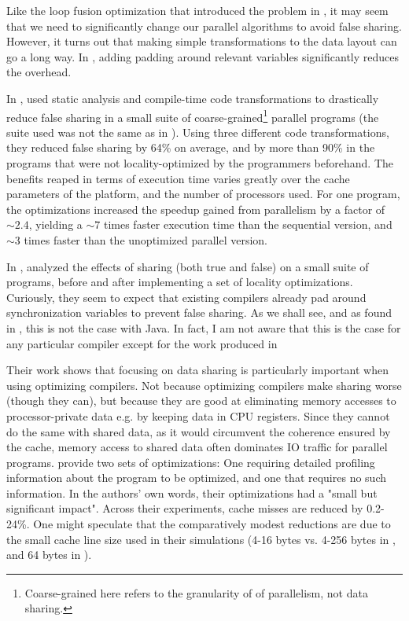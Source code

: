 Like the loop fusion optimization that introduced the problem in \cite{mystery},
it may seem that we need to significantly change our parallel algorithms to
avoid false sharing. However, it turns out that making simple transformations to
the data layout can go a long way. In \cite{mystery}, adding padding around
relevant variables significantly reduces the overhead.

In \citeyear{eggersReducing}, \citeauthor{eggersReducing} used static analysis
and compile-time code transformations to drastically reduce false sharing in a
small suite of coarse-grained\footnote{Coarse-grained here refers to the
granularity of of parallelism, not data sharing.} parallel programs
\cite{eggersReducing} (the suite used was not the same as in \cite{eggersbus}).
Using three different code transformations, they reduced false sharing by 64\%
on average, and by more than 90\% in the programs that were not
locality-optimized by the programmers beforehand. The benefits reaped in terms
of execution time varies greatly over the cache parameters of the platform, and
the number of processors used. For one program, the optimizations increased the
speedup gained from parallelism by a factor of $\sim 2.4$, yielding a $\sim 7$
times faster execution time than the sequential version, and $\sim 3$ times
faster than the unoptimized parallel version.

In \citeyear{TorrellasShared}, \citeauthor{TorrellasShared}
\cite{TorrellasShared} analyzed the effects of sharing (both true and false)
on a small suite of programs, before and after implementing a set of locality
optimizations. Curiously, they seem to expect that existing compilers already
pad around synchronization variables to prevent false sharing. As we shall see,
and as found in \cite{mystery}, this is not the case with Java. In fact, I am
not aware that this is the case for any particular compiler except for the work
produced in \cite{eggersReducing}

Their work \cite{TorrellasShared} shows that focusing on data sharing is
particularly important when using optimizing compilers. Not because optimizing
compilers make sharing worse (though they can), but because they are good at
eliminating memory accesses to processor-private data e.g. by keeping data in
CPU registers. Since they cannot do the same with shared data, as it would
circumvent the coherence ensured by the cache, memory access to shared data
often dominates IO traffic for parallel programs.
\citeauthor{TorrellasShared}  \cite{TorrellasShared}
provide two sets of optimizations: One requiring detailed profiling information
about the program to be optimized, and one that requires no such information. In
the authors' own words, their optimizations had a "small but significant
impact". Across their experiments, cache misses are reduced by 0.2-24\%. One
might speculate that the comparatively modest reductions are due to the small
cache line size used in their simulations (4-16 bytes vs. 4-256 bytes in
\cite{eggersReducing}, and 64 bytes in \cite{mystery}).

